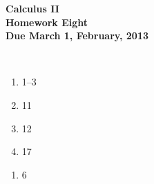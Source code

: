 \documentclass[12pt]{article}
\begin{document}
\pagestyle{empty}

\begin{center}
{\large {\bf Calculus II}}\\
\medskip
{\large {\bf Homework Eight}}\\
\medskip
{ {\bf Due March 1, February, 2013}}\\
\end{center}

\hspace{2mm}\\




\begin{enumerate}
\setlength{\itemsep}{-1mm}
  \item 1--3
  \item 11
  \item 12
  \item 17
\end{enumerate}

\begin{enumerate}
\setlength{\itemsep}{-1mm}
  \item 6
\end{enumerate}

\end{document}
